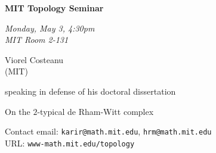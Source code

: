 \documentclass{slides}
\begin{document}
\begin{center}

{\fontsize {54pt}{40pt}\selectfont

\textrm{
{\textbf{MIT Topology Seminar}}}
}
\medskip

{\large\textrm{\emph{Monday, May 3, 4:30pm\\MIT Room 2-131}}}



\bigskip

\textrm{{\LARGE Viorel Costeanu  \\[.5cm](MIT)}}

\bigskip\bigskip\bigskip
\textrm{speaking in defense of his doctoral dissertation}
\bigskip\bigskip\bigskip

\textrm{\LARGE On the $2$-typical de Rham-Witt complex}\\

\end{center}

\vspace{1cm}

{\small
\textrm{Contact email: } \texttt{karir@math.mit.edu}, \texttt{hrm@math.mit.edu}\\
\textrm{URL: } \texttt{www-math.mit.edu/topology}
}
\end{document}
